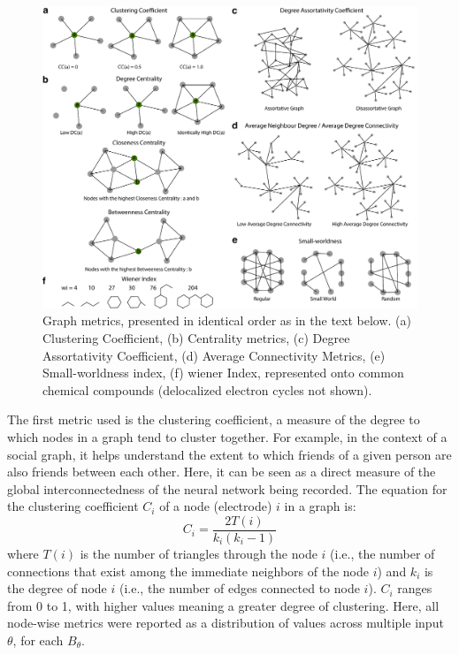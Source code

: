 \begin{figure}[h!tbp]
\vspace{0.1cm}
\centering
\includegraphics[width=1.\textwidth]{fig/chap5_graph_metrics.pdf}
\caption[Graph metrics.]{Graph metrics, presented in identical order as in the text below. (a) Clustering Coefficient, (b) Centrality metrics, (c) Degree Assortativity Coefficient, (d) Average Connectivity Metrics, (e) Small-worldness index, (f) wiener Index, represented onto common chemical compounds (delocalized electron cycles not shown).}
\label{fig_chap5_graph_metrics} 
\end{figure} 

The first metric used is the clustering coefficient, a measure of the degree to which nodes in a graph tend to cluster together. For example, in the context of a social graph, it helps understand the extent to which friends of a given person are also friends between each other. Here, it can be seen as a direct measure of the global interconnectedness of the neural network being recorded.
The equation for the clustering coefficient \( C_i \) of a node (electrode) \( i \) in a graph is:
\begin{equation}
    C_i = \frac{2T(i)}{k_i(k_i - 1)}
\end{equation}
where \( T(i) \) is the number of triangles through the node \( i \) (i.e., the number of connections that exist among the immediate neighbors of the node \( i \)) and \( k_i \) is the degree of node \( i \) (i.e., the number of edges connected to node \( i \)). \( C_i \) ranges from 0 to 1, with higher values meaning a greater degree of clustering. Here, all node-wise metrics were reported as a distribution of values across multiple input $\theta$, for each $B_\theta$.

